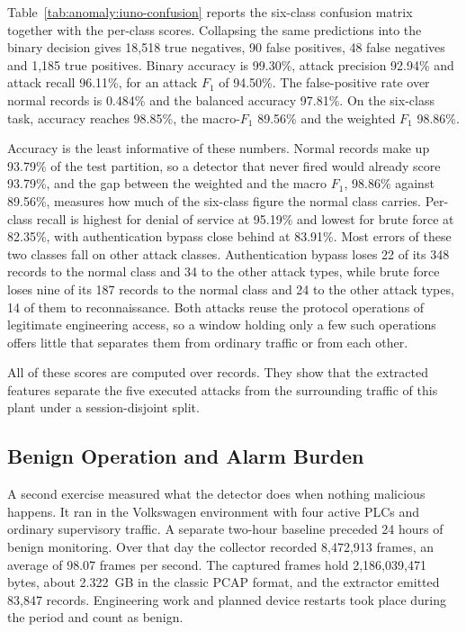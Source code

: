 Table~\ref{tab:anomaly:iuno-confusion} reports the six-class confusion matrix together with the
per-class scores. Collapsing the same predictions into the binary decision gives 18,518 true
negatives, 90 false positives, 48 false negatives and 1,185 true positives. Binary accuracy is
99.30\%, attack precision 92.94\% and attack recall 96.11\%, for an attack
$F_1$ of 94.50\%. The false-positive rate over normal records is 0.484\% and the
balanced accuracy 97.81\%. On the six-class task, accuracy reaches 98.85\%, the
macro-$F_1$ 89.56\% and the weighted $F_1$ 98.86\%.

Accuracy is the least informative of these numbers. Normal records make up 93.79\% of the
test partition, so a detector that never fired would already score 93.79\%, and the gap
between the weighted and the macro $F_1$, 98.86\% against 89.56\%, measures how much of the
six-class figure the normal class carries. Per-class recall is highest for denial of service at
95.19\% and lowest for brute force at 82.35\%, with authentication bypass close
behind at 83.91\%. Most errors of these two classes fall on other attack classes.
Authentication bypass loses 22 of its 348 records to the normal class and 34 to the other attack
types, while brute force loses nine of its 187 records to the normal class and 24 to the other
attack types, 14 of them to reconnaissance. Both attacks reuse the protocol operations of
legitimate engineering access, so a window holding only a few such operations offers little that
separates them from ordinary traffic or from each other.

All of these scores are computed over records. They show that the extracted features separate
the five executed attacks from the surrounding traffic of this plant under a session-disjoint
split.

\subsection{Benign Operation and Alarm Burden}
\label{sec:anomaly:iuno-field}

A second exercise measured what the detector does when nothing malicious happens. It ran in the
Volkswagen environment with four active PLCs and ordinary supervisory traffic. A separate
two-hour baseline preceded 24 hours of benign monitoring. Over that day the collector recorded
8,472,913 frames, an average of 98.07 frames per second. The captured frames hold 2,186,039,471
bytes, about 2.322~GB in the classic PCAP format, and the extractor emitted 83,847 records.
Engineering work and planned device restarts took place during the period and count as benign.

